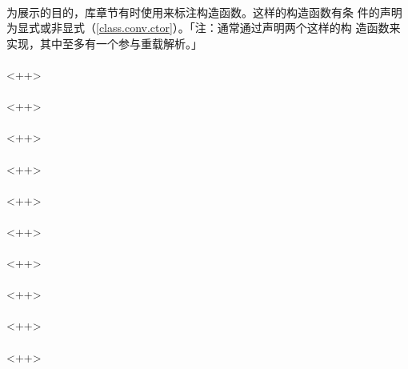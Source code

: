 \paragraph{}
为展示的目的，库章节有时使用来标注构造函数。这样的构造函数有条
件的声明为显式或非显式（\ref{class.conv.ctor}）。「注：通常通过声明两个这样的构
造函数来实现，其中至多有一个参与重载解析。」

\paragraph{}
<++>

\paragraph{}
<++>

\paragraph{}
<++>

\paragraph{}
<++>

\paragraph{}
<++>

\paragraph{}
<++>

\paragraph{}
<++>

\paragraph{}
<++>

\paragraph{}
<++>

\paragraph{}
<++>

